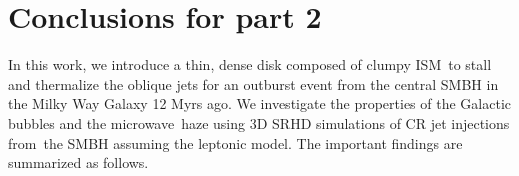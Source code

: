 
\chapter{Conclusions for part 2}
\label{c:conclusions-2}

\label{Conclusions}
In this work, we introduce a thin, dense disk composed of clumpy ISM\
to stall and thermalize the oblique jets for an outburst event from
the central SMBH in the Milky Way Galaxy 12 Myrs ago.
We investigate the properties of the Galactic bubbles and the microwave\
haze using 3D SRHD simulations of CR jet injections from\
the SMBH assuming the leptonic model. The important findings are summarized as follows.

